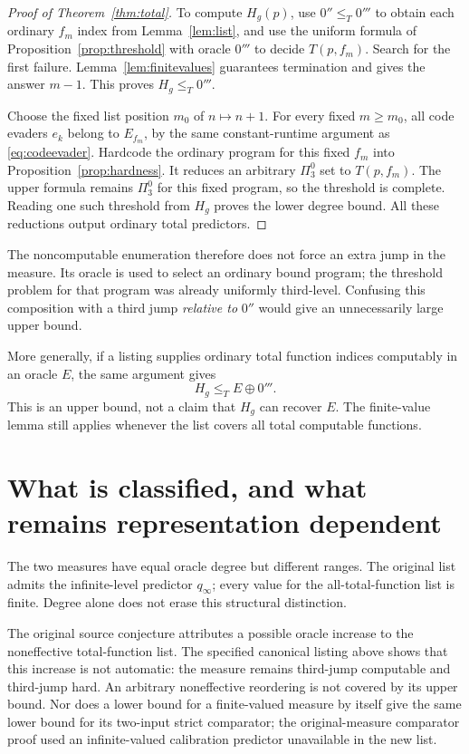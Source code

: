 \documentclass[11pt]{article}
\begin{document}
\begin{proof}[Proof of Theorem~\ref{thm:total}]
To compute $H_g(p)$, use $0''\le_T0'''$ to obtain each ordinary
$f_m$ index from Lemma~\ref{lem:list}, and use the uniform formula
of Proposition~\ref{prop:threshold} with oracle $0'''$ to decide
$T(p,f_m)$. Search for the first failure. Lemma~\ref{lem:finitevalues}
guarantees termination and gives the answer $m-1$. This proves
$H_g\le_T0'''$.

Choose the fixed list position $m_0$ of $n\mapsto n+1$.
For every fixed $m\ge m_0$, all code evaders $e_k$ belong to
$E_{f_m}$, by the same constant-runtime argument as
\eqref{eq:codeevader}. Hardcode the ordinary program for this
fixed $f_m$ into Proposition~\ref{prop:hardness}. It reduces an
arbitrary $\Pi^0_3$ set to $T(p,f_m)$. The upper formula remains
$\Pi^0_3$ for this fixed program, so the threshold is complete.
Reading one such threshold from $H_g$ proves the lower degree
bound. All these reductions output ordinary total predictors.
\end{proof}

The noncomputable enumeration therefore does not force an extra
jump in the measure. Its oracle is used to select an ordinary
bound program; the threshold problem for that program was already
uniformly third-level. Confusing this composition with a third
jump \emph{relative to} $0''$ would give an unnecessarily large
upper bound.

More generally, if a listing supplies ordinary total function
indices computably in an oracle $E$, the same argument gives
\[
 H_g\le_T E\oplus0'''.
\]
This is an upper bound, not a claim that $H_g$ can recover $E$.
The finite-value lemma still applies whenever the list covers
all total computable functions.

\section{What is classified, and what remains representation dependent}

The two measures have equal oracle degree but different ranges.
The original list admits the infinite-level predictor $q_\infty$;
every value for the all-total-function list is finite. Degree alone
does not erase this structural distinction.

The original source conjecture attributes a possible oracle increase
to the noneffective total-function list. The specified canonical
listing above shows that this increase is not automatic: the
measure remains third-jump computable and third-jump hard.
An arbitrary noneffective reordering is not covered by its upper
bound. Nor does a lower bound for a finite-valued measure by itself
give the same lower bound for its two-input strict comparator;
the original-measure comparator proof used an infinite-valued
calibration predictor unavailable in the new list.
\end{document}
